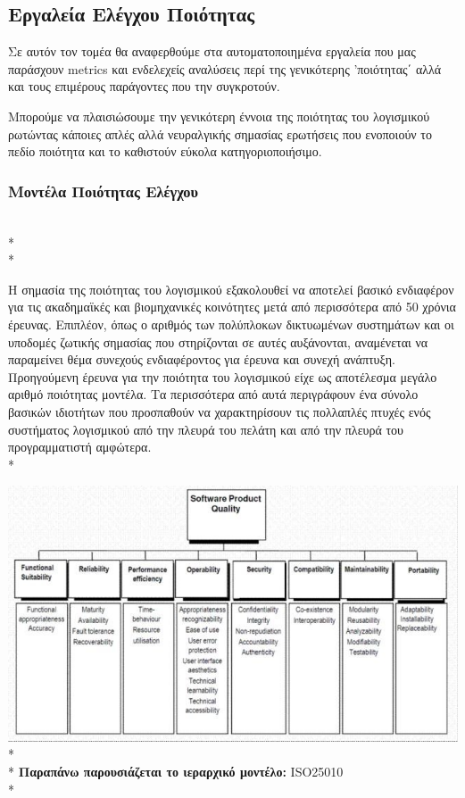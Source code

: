 \documentclass[a4paper, 11pt]{article}
\begin{document}
{{\subsection{Εργαλεία Ελέγχου Ποιότητας}
Σε αυτόν τον τομέα θα αναφερθούμε στα αυτοματοποιημένα εργαλεία που μας παράσχουν metrics και ενδελεχείς αναλύσεις περί της γενικότερης 'ποιότητας΄ αλλά και τους επιμέρους παράγοντες που την συγκροτούν.

Μπορούμε να πλαισιώσουμε την γενικότερη έννοια της ποιότητας του λογισμικού ρωτώντας κάποιες απλές αλλά νευραλγικής σημασίας ερωτήσεις που ενοποιούν το πεδίο ποιότητα και το καθιστούν εύκολα κατηγοριοποιήσιμο.
\subsubsection{Μοντέλα Ποιότητας Ελέγχου}
\\*
\\*

Η σημασία της ποιότητας του λογισμικού εξακολουθεί να αποτελεί βασικό ενδιαφέρον για 
τις ακαδημαϊκές και βιομηχανικές κοινότητες μετά από περισσότερα από 50 χρόνια έρευνας. Επιπλέον, όπως ο αριθμός των πολύπλοκων δικτυωμένων συστημάτων και
οι υποδομές ζωτικής σημασίας που στηρίζονται σε αυτές αυξάνονται, αναμένεται να παραμείνει 
θέμα συνεχούς ενδιαφέροντος για έρευνα και συνεχή ανάπτυξη.
Προηγούμενη έρευνα για την ποιότητα του λογισμικού είχε ως αποτέλεσμα μεγάλο αριθμό ποιότητας
μοντέλα. Τα περισσότερα από αυτά περιγράφουν ένα σύνολο βασικών ιδιοτήτων που προσπαθούν να   χαρακτηρίσουν τις πολλαπλές πτυχές ενός συστήματος λογισμικού από την πλευρά του πελάτη και από την πλευρά του προγραμματιστή αμφώτερα.
\\*



\includegraphics{images/ISO25010.jpg}\\*
\\*
\textbf{Παραπάνω παρουσιάζεται το ιεραρχικό μοντέλο: }
\textlatin{ISO25010}\\*

}}
\end{document}
